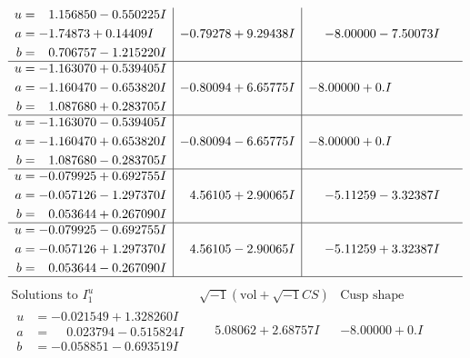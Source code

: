 \documentclass[1p]{elsarticle_modified}
\theoremstyle{definition}
\newcommand{\I}{\sqrt{-1}}
\begin{document}
$$\begin{array}{c|c|c}
\begin{aligned}
u &= \phantom{-}1.156850 - 0.550225 I \\
a &= -1.74873 + 0.14409 I \\
b &= \phantom{-}0.706757 - 1.215220 I\end{aligned}
 & -0.79278 + 9.29438 I & -8.00000 - 7.50073 I \\ \hline\begin{aligned}
u &= -1.163070 + 0.539405 I \\
a &= -1.160470 - 0.653820 I \\
b &= \phantom{-}1.087680 + 0.283705 I\end{aligned}
 & -0.80094 + 6.65775 I & -8.00000 + 0. I\phantom{ +0.000000I} \\ \hline\begin{aligned}
u &= -1.163070 - 0.539405 I \\
a &= -1.160470 + 0.653820 I \\
b &= \phantom{-}1.087680 - 0.283705 I\end{aligned}
 & -0.80094 - 6.65775 I & -8.00000 + 0. I\phantom{ +0.000000I} \\ \hline\begin{aligned}
u &= -0.079925 + 0.692755 I \\
a &= -0.057126 - 1.297370 I \\
b &= \phantom{-}0.053644 + 0.267090 I\end{aligned}
 & \phantom{-}4.56105 + 2.90065 I & -5.11259 - 3.32387 I \\ \hline\begin{aligned}
u &= -0.079925 - 0.692755 I \\
a &= -0.057126 + 1.297370 I \\
b &= \phantom{-}0.053644 - 0.267090 I\end{aligned}
 & \phantom{-}4.56105 - 2.90065 I & -5.11259 + 3.32387 I\\
 \hline 
 \end{array}$$\newpage$$\begin{array}{c|c|c}  
\text{Solutions to }I^u_{1}& \I (\text{vol} + \sqrt{-1}CS) & \text{Cusp shape}\\
 \hline 
\begin{aligned}
u &= -0.021549 + 1.328260 I \\
a &= \phantom{-}0.023794 - 0.515824 I \\
b &= -0.058851 - 0.693519 I\end{aligned}
 & \phantom{-}5.08062 + 2.68757 I & -8.00000 + 0. I\phantom{ +0.000000I} \\ \hline\begin{aligned}

\end{aligned}
\end{array}$$
\end{document}
